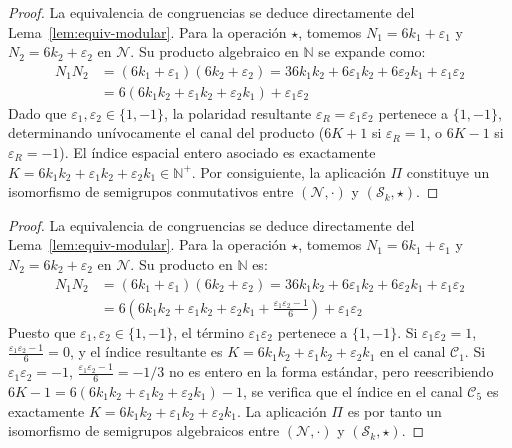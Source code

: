 \documentclass{article}
\numberwithin{equation}{section}
\theoremstyle{plain}
\theoremstyle{definition}
\begin{document}
\begin{proof}
La equivalencia de congruencias se deduce directamente del Lema~\ref{lem:equiv-modular}. Para la operación $\star$, tomemos $N_1 = 6k_1 + \varepsilon_1$ y $N_2 = 6k_2 + \varepsilon_2$ en $\mathcal{N}$. Su producto algebraico en $\mathbb{N}$ se expande como:
\begin{align}
N_1 N_2 &= (6k_1 + \varepsilon_1)(6k_2 + \varepsilon_2) = 36 k_1 k_2 + 6 \varepsilon_1 k_2 + 6 \varepsilon_2 k_1 + \varepsilon_1 \varepsilon_2 \nonumber \\
&= 6 \left( 6 k_1 k_2 + \varepsilon_1 k_2 + \varepsilon_2 k_1 \right) + \varepsilon_1 \varepsilon_2
\end{align}
Dado que $\varepsilon_1, \varepsilon_2 \in \{1, -1\}$, la polaridad resultante $\varepsilon_R = \varepsilon_1 \varepsilon_2$ pertenece a $\{1, -1\}$, determinando unívocamente el canal del producto ($6K + 1$ si $\varepsilon_R = 1$, o $6K - 1$ si $\varepsilon_R = -1$). El índice espacial entero asociado es exactamente $K = 6k_1k_2 + \varepsilon_1 k_2 + \varepsilon_2 k_1 \in \mathbb{N}^+$. Por consiguiente, la aplicación $\Pi$ constituye un isomorfismo de semigrupos conmutativos entre $(\mathcal{N}, \cdot)$ y $(\mathcal{S}_k, \star)$.
\end{proof}

\begin{proof}
La equivalencia de congruencias se deduce directamente del Lema~\ref{lem:equiv-modular}. Para la operación $\star$, tomemos $N_1 = 6k_1 + \varepsilon_1$ y $N_2 = 6k_2 + \varepsilon_2$ en $\mathcal{N}$. Su producto en $\mathbb{N}$ es:
\begin{align}
N_1 N_2 &= (6k_1 + \varepsilon_1)(6k_2 + \varepsilon_2) = 36 k_1 k_2 + 6 \varepsilon_1 k_2 + 6 \varepsilon_2 k_1 + \varepsilon_1 \varepsilon_2 \nonumber \\
&= 6 \left( 6 k_1 k_2 + \varepsilon_1 k_2 + \varepsilon_2 k_1 + \frac{\varepsilon_1 \varepsilon_2 - 1}{6} \right) + \varepsilon_1 \varepsilon_2
\end{align}
Puesto que $\varepsilon_1, \varepsilon_2 \in \{1, -1\}$, el término $\varepsilon_1 \varepsilon_2$ pertenece a $\{1, -1\}$. Si $\varepsilon_1 \varepsilon_2 = 1$, $\frac{\varepsilon_1 \varepsilon_2 - 1}{6} = 0$, y el índice resultante es $K = 6k_1k_2 + \varepsilon_1 k_2 + \varepsilon_2 k_1$ en el canal $\mathcal{C}_1$. Si $\varepsilon_1 \varepsilon_2 = -1$, $\frac{\varepsilon_1 \varepsilon_2 - 1}{6} = -1/3$ no es entero en la forma estándar, pero reescribiendo $6K - 1 = 6(6k_1k_2 + \varepsilon_1 k_2 + \varepsilon_2 k_1) - 1$, se verifica que el índice en el canal $\mathcal{C}_5$ es exactamente $K = 6k_1k_2 + \varepsilon_1 k_2 + \varepsilon_2 k_1$. La aplicación $\Pi$ es por tanto un isomorfismo de semigrupos algebraicos entre $(\mathcal{N}, \cdot)$ y $(\mathcal{S}_k, \star)$.
\end{proof}
\end{document}
